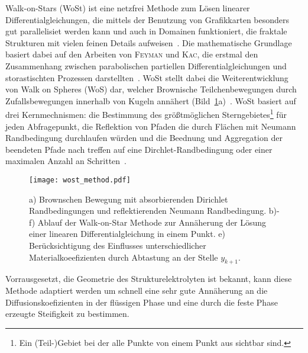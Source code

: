 Walk-on-Stars (WoSt) ist eine netzfrei Methode zum Lösen linearer Differentialgleichungen, die mittels der Benutzung von Grafikkarten besonders gut parallelisiet werden kann und auch in Domainen funktioniert, die fraktale Strukturen mit vielen feinen Details aufweisen~\cite{Sawhney2023a}. Die mathematische Grundlage basiert dabei auf den Arbeiten von \textsc{Feyman} und \textsc{Kac}, die erstmal den Zusammenhang zwischen parabolischen partiellen Differentialgleichungen und storastischten Prozessen darstellten~\cite{Pascucci2024}. 
WoSt stellt dabei die Weiterentwicklung von Walk on Spheres (WoS) dar, welcher Brownische Teilchenbewegungen durch Zufallsbewegungen innerhalb von Kugeln annähert (Bild~\ref{fig:wost_method}a)~\cite{Sawhney2020}. WoSt basiert auf drei Kernmechnismen: die Bestimmung des größtmöglichen Sterngebietes\footnote{Ein (Teil-)Gebiet bei der alle Punkte von einem Punkt aus sichtbar sind.} für jeden Abfragepunkt, die Reflektion von Pfaden die durch Flächen mit Neumann Randbedingung durchlaufen würden und die Beednung und Aggregation der beendeten Pfade nach treffen auf eine Dirchlet-Randbedingung oder einer maximalen Anzahl an Schritten~\cite{Sawhney2023a}.

\begin{figure}[!h]
        \center
		\texttt{[image: wost\_method.pdf]}
		\caption{\label{fig:wost_method}a) Brownschen Bewegung mit absorbierenden Dirichlet Randbedingungen und reflektierenden Neumann Randbedingung. b)-f) Ablauf der Walk-on-Star Methode zur Annäherung der Lösung einer linearen Differentialgleichung in einem Punkt. e) Berücksichtigung des Einflusses unterschiedlicher Materialkoeefizienten durch Abtastung an der Stelle $y_{k+1}$.
        }
\end{figure}

Vorrausgesetzt, die Geometrie des Strukturelektrolyten ist bekannt, kann diese Methode adaptiert werden um schnell eine sehr gute Annäherung an die Diffusionskoefizienten in der flüssigen Phase und eine durch die feste Phase erzeugte Steifigkeit zu bestimmen.

